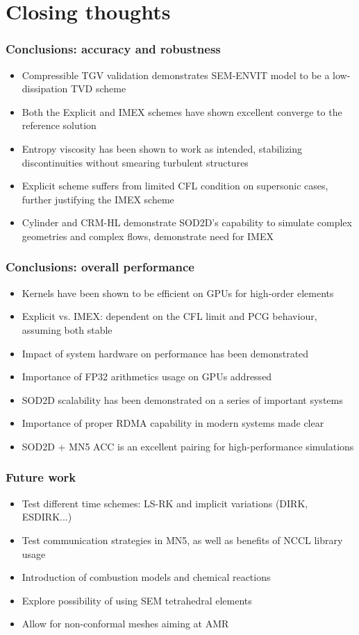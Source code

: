 \section{Closing thoughts}

\begin{frame}
    \frametitle{Conclusions: accuracy and robustness}
    \begin{itemize}
        \item Compressible TGV validation demonstrates SEM-ENVIT model to be a low-dissipation TVD scheme
        \item Both the Explicit and IMEX schemes have shown excellent converge to the reference solution
        \item Entropy viscosity has been shown to work as intended, stabilizing discontinuities without smearing turbulent structures
        \item Explicit scheme suffers from limited CFL condition on supersonic cases, further justifying the IMEX scheme
        \item Cylinder and CRM-HL demonstrate SOD2D's capability to simulate complex geometries and complex flows, demonstrate need for IMEX
    \end{itemize}
\end{frame}

\begin{frame}
    \frametitle{Conclusions: overall performance}
    \begin{itemize}
        \item Kernels have been shown to be efficient on GPUs for high-order elements
        \item Explicit vs. IMEX: dependent on the CFL limit and PCG behaviour, assuming both stable
        \item Impact of system hardware on performance has been demonstrated
        \item Importance of FP32 arithmetics usage on GPUs addressed
        \item SOD2D scalability has been demonstrated on a series of important systems
        \item Importance of proper RDMA capability in modern systems made clear
        \item SOD2D + MN5 ACC is an excellent pairing for high-performance simulations
    \end{itemize}
\end{frame}

\begin{frame}
    \frametitle{Future work}
    \begin{itemize}
        \item Test different time schemes: LS-RK and implicit variations (DIRK, ESDIRK...)
        \item Test communication strategies in MN5, as well as benefits of NCCL library usage
        \item Introduction of combustion models and chemical reactions
        \item Explore possibility of using SEM tetrahedral elements
        \item Allow for non-conformal meshes aiming at AMR
    \end{itemize}
\end{frame}